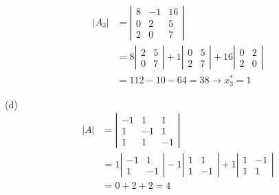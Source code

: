 \begin{enumerate}
\[
\begin{aligned}
\left|A_{3}\right| & =\left|\begin{array}{ccc}
8 & -1 & 16 \\
0 & 2 & 5 \\
2 & 0 & 7
\end{array}\right| \\
& =8\left|\begin{array}{cc}
2 & 5 \\
0 & 7
\end{array}\right|+1\left|\begin{array}{cc}
0 & 5 \\
2 & 7
\end{array}\right|+16\left|\begin{array}{ll}
0 & 2 \\
2 & 0
\end{array}\right| \\
& =112-10-64=38 \rightarrow x_{3}^{*}=1 
\end{aligned}
\]

(d) 
\[
\begin{aligned}
|A| & =\left|\begin{array}{rrr}
-1 & 1 & 1 \\
1 & -1 & 1 \\
1 & 1 & -1
\end{array}\right| \\
& =1\left|\begin{array}{rr}
-1 & 1 \\
1 & -1
\end{array}\right|-1\left|\begin{array}{rr}
1 & 1 \\
1 & -1
\end{array}\right|+1\left|\begin{array}{rr}
1 & -1 \\
1 & 1
\end{array}\right| \\
& =0+2+2=4
\end{aligned}
\]


\end{enumerate}
